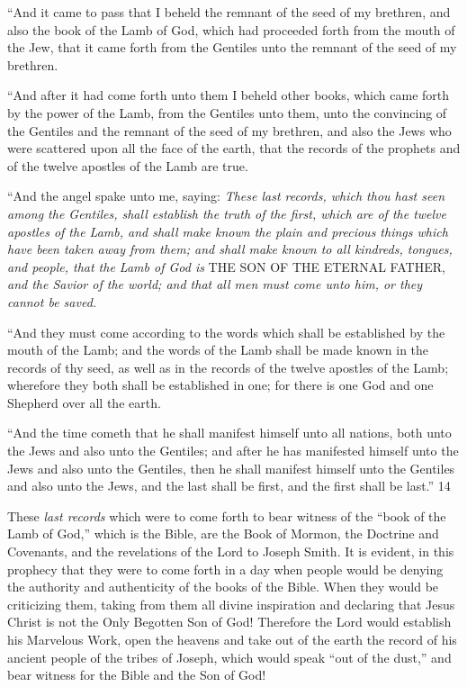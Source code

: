 ``And it came to pass that I beheld the remnant of the seed of my brethren, and also the book
of the Lamb of God, which had proceeded forth from the mouth of the Jew, that it came forth
from the Gentiles unto the remnant of the seed of my brethren.

``And after it had come forth unto them I beheld other books, which came forth by the power
of the Lamb, from the Gentiles unto them, unto the convincing of the Gentiles and the
remnant of the seed of my brethren, and also the Jews who were scattered upon all the face of
the earth, that the records of the prophets and of the twelve apostles of the Lamb are true.

``And the angel spake unto me, saying: \textit{These last records, which thou hast seen among the
Gentiles, shall establish the truth of the first, which are of the twelve apostles of the Lamb,
and shall make known the plain and precious things which have been taken away from them;
and shall make known to all kindreds, tongues, and people, that the Lamb of God is} THE
SON OF THE ETERNAL FATHER, \textit{and the Savior of the world; and that all men must
come unto him, or they cannot be saved.}

``And they must come according to the words which shall be established by the mouth of the
Lamb; and the words of the Lamb shall be made known in the records of thy seed, as well as
in the records of the twelve apostles of the Lamb; wherefore they both shall be established in
one; for there is one God and one Shepherd over all the earth.

``And the time cometh that he shall manifest himself unto all nations, both unto the Jews and
also unto the Gentiles; and after he has manifested himself unto the Jews and also unto the
Gentiles, then he shall manifest himself unto the Gentiles and also unto the Jews, and the last
shall be first, and the first shall be last.'' 14

These \textit{last records} which were to come forth to bear witness of the ``book of the Lamb of
God,'' which is the Bible, are the Book of Mormon, the Doctrine and Covenants, and the
revelations of the Lord to Joseph Smith. It is evident, in this prophecy that they were to come
forth in a day when people would be denying the authority and authenticity of the books of
the Bible. When they would be criticizing them, taking from them all divine inspiration and
declaring that Jesus Christ is not the Only Begotten Son of God! Therefore the Lord would
establish his Marvelous Work, open the heavens and take out of the earth the record of his
ancient people of the tribes of Joseph, which would speak ``out of the dust,'' and bear witness
for the Bible and the Son of God!


